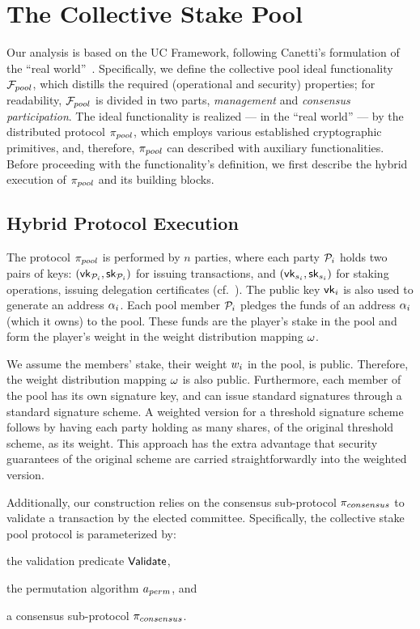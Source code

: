 \section{The Collective Stake Pool}\label{sec:stake-pool}

Our analysis is based on the UC Framework, following Canetti's formulation of
the ``real world''~\cite{EPRINT:Canetti00}. Specifically, we define the
collective pool ideal functionality ${\mathcal{F}}_{pool}$, which distills the required
(operational and security) properties; for readability, ${\mathcal{F}}_{pool}$ is divided in
two parts, \emph{management} and \emph{consensus participation}. The ideal
functionality is realized --- in the ``real world'' --- by the distributed
protocol $\pi_{pool}$, which employs various established cryptographic primitives,
and, therefore, $\pi_{pool}$ can described with auxiliary functionalities.
Before proceeding with the functionality's definition, we first describe the
hybrid execution of $\pi_{pool}$ and its building blocks.

\subsection{Hybrid Protocol Execution}\label{sec:execution}

The protocol $\pi_{pool}$ is performed by $n$ parties, where each party $\mathcal{P}_i$
holds two pairs of keys: $(\mathsf{vk}_{\mathcal{P}_{i}}, \mathsf{sk}_{\mathcal{P}_{i}})$ for issuing
transactions, and $(\mathsf{vk}_{s_{i}}, \mathsf{sk}_{s_{i}})$ for staking
operations, \eg issuing delegation certificates (cf.~\cite{SCN:KarKiaLar20}). The
public key $\mathsf{vk}_{i}$ is also used to generate an address $\alpha_{i}$.
Each pool member $\mathcal{P}_i$ pledges the funds of an address $\alpha_{i}$ (which it
owns) to the pool. These funds are the player's stake in the pool and form
the player's weight in the weight distribution mapping $\omega$.

We assume the members' stake, \ie their weight $w_{i}$ in the pool, is
public. Therefore, the weight distribution mapping $\omega$ is also public.
Furthermore, each member of the pool has its own signature key, and can issue
standard signatures through a standard signature scheme.  A
weighted version for a threshold signature scheme follows by having each party
holding as many shares, of the original threshold scheme, as its weight. This
approach has the extra advantage that security guarantees of the original
scheme are carried straightforwardly into the weighted version.

Additionally, our construction relies on the consensus sub-protocol $\pi_{consensus}$
to validate a transaction by the elected committee.
Specifically, the collective stake pool protocol is
parameterized by:
\begin{inparaenum}[i)]
    \item the validation predicate $\mathsf{Validate}$,
    \item the permutation algorithm $a_{perm}$, and
    \item a consensus sub-protocol $\pi_{consensus}$.
\end{inparaenum}

